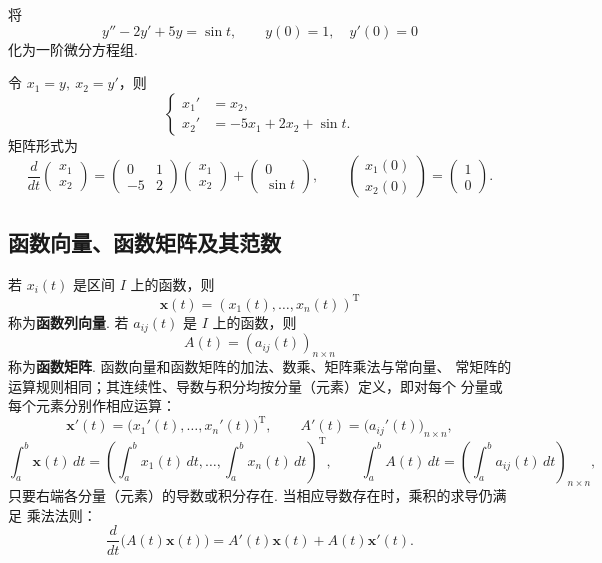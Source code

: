 \begin{eg}
将
\[
y''-2y'+5y=\sin t,\qquad y(0)=1,\quad y'(0)=0
\]
化为一阶微分方程组.
\begin{pf2}
令 $x_1=y,\ x_2=y'$，则
\[
\left\{
\begin{aligned}
x_1'&=x_2,\\
x_2'&=-5x_1+2x_2+\sin t.
\end{aligned}
\right.
\]
矩阵形式为
\[
\frac{d}{dt}
\begin{pmatrix}x_1\\x_2\end{pmatrix}
=
\begin{pmatrix}0&1\\-5&2\end{pmatrix}
\begin{pmatrix}x_1\\x_2\end{pmatrix}
+\begin{pmatrix}0\\\sin t\end{pmatrix},
\qquad
\begin{pmatrix}x_1(0)\\x_2(0)\end{pmatrix}
=
\begin{pmatrix}1\\0\end{pmatrix}.
\]
\end{pf2}
\end{eg}

\subsection{函数向量、函数矩阵及其范数}

若 $x_i(t)$ 是区间 $I$ 上的函数，则
\[
\bm{x}(t)=(x_1(t),\ldots,x_n(t))^\mathrm{T}
\]
称为\textbf{函数列向量}. 若 $a_{ij}(t)$ 是 $I$ 上的函数，则
\[
A(t)=(a_{ij}(t))_{n\times n}
\]
称为\textbf{函数矩阵}. 函数向量和函数矩阵的加法、数乘、矩阵乘法与常向量、
常矩阵的运算规则相同；其连续性、导数与积分均按分量（元素）定义，即对每个
分量或每个元素分别作相应运算：
\[
\bm{x}'(t)=\bigl(x_1'(t),\ldots,x_n'(t)\bigr)^\mathrm{T},\qquad
A'(t)=\bigl(a_{ij}'(t)\bigr)_{n\times n},
\]
\[
\int_a^b\bm{x}(t)\,dt
=\left(\int_a^b x_1(t)\,dt,\ldots,\int_a^b x_n(t)\,dt\right)^\mathrm{T},
\qquad
\int_a^b A(t)\,dt=\left(\int_a^b a_{ij}(t)\,dt\right)_{n\times n},
\]
只要右端各分量（元素）的导数或积分存在. 当相应导数存在时，乘积的求导仍满足
乘法法则：
\begin{equation}\label{equ:4.6}
\frac{d}{dt}\bigl(A(t)\bm{x}(t)\bigr)
=A'(t)\bm{x}(t)+A(t)\bm{x}'(t).
\end{equation}

